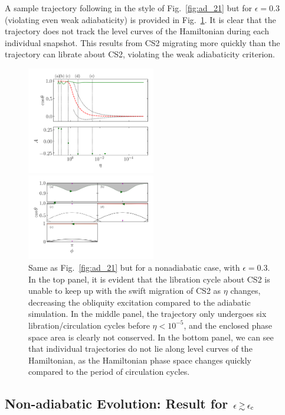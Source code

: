 \documentclass[
        fleqn,
        usenatbib,
    ]{mnras}
\begin{document}
A sample trajectory following in the style of Fig.~\ref{fig:ad_21} but for
$\epsilon = 0.3$ (violating even weak adiabaticity) is provided in
Fig.~\ref{fig:nonad_traj}. It is clear that the trajectory does not track the
level curves of the Hamiltonian during each individual snapshot. This results
from CS2 migrating more quickly than the trajectory can librate about CS2,
violating the weak adiabaticity criterion.
\begin{figure}
    \centering
    \includegraphics[width=0.5\textwidth]{plots_diskdisp/3testo_nonad.png}

    \includegraphics[width=0.5\textwidth]{plots_diskdisp/3testo_nonad_subplots.png}
    \caption{Same as Fig.~\ref{fig:ad_21} but for a nonadiabatic case, with $\epsilon =
    0.3$. In the top panel, it is evident that the libration cycle about CS2 is
    unable to keep up with the swift migration of CS2 as $\eta$ changes,
    decreasing the obliquity excitation compared to the adiabatic simulation. In
    the middle panel, the trajectory only undergoes six libration/circulation
    cycles before $\eta < 10^{-5}$, and the enclosed phase space area is
    clearly not conserved. In the bottom panel, we can see that individual
    trajectories do not lie along level curves of the Hamiltonian, as the
    Hamiltonian phase space changes quickly compared to the period of
    circulation cycles.}\label{fig:nonad_traj}
\end{figure}

\subsection{Non-adiabatic Evolution:
Result for $\epsilon\gtrsim \epsilon_{\rm c}$}
\end{document}
